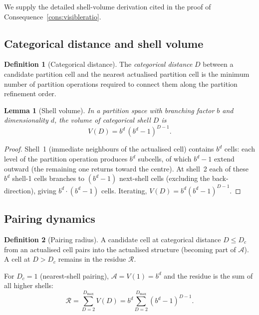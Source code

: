 \documentclass[11pt,twocolumn,a4paper]{article}
\theoremstyle{axiomstyle}
\theoremstyle{conseqstyle}
\newtheorem{lemma}{Lemma}
\theoremstyle{definition}
\newtheorem{definition}{Definition}
\theoremstyle{remark}
\newcommand{\Residue}{\mathcal{R}}
\begin{document}
We supply the detailed shell-volume derivation cited in the proof of Consequence~\ref{cons:visibleratio}.

\subsection{Categorical distance and shell volume}

\begin{definition}[Categorical distance]
The \emph{categorical distance} $D$ between a candidate partition cell and the nearest actualised partition cell is the minimum number of partition operations required to connect them along the partition refinement order.
\end{definition}

\begin{lemma}[Shell volume]\label{lem:shellvolume}
In a partition space with branching factor $b$ and dimensionality $d$, the volume of categorical shell $D$ is
\begin{equation}
V(D)=b^{d}\,(b^{d}-1)^{D-1}.
\end{equation}
\end{lemma}

\begin{proof}
Shell~1 (immediate neighbours of the actualised cell) contains $b^{d}$ cells: each level of the partition operation produces $b^{d}$ subcells, of which $b^{d}-1$ extend outward (the remaining one returns toward the centre). At shell~2 each of these $b^{d}$ shell-1 cells branches to $(b^{d}-1)$ next-shell cells (excluding the back-direction), giving $b^{d}\cdot(b^{d}-1)$ cells. Iterating, $V(D)=b^{d}(b^{d}-1)^{D-1}$.
\end{proof}

\subsection{Pairing dynamics}

\begin{definition}[Pairing radius]
A candidate cell at categorical distance $D\leq D_{c}$ from an actualised cell pairs into the actualised structure (becoming part of $\mathcal{A}$). A cell at $D>D_{c}$ remains in the residue $\Residue$.
\end{definition}

For $D_{c}=1$ (nearest-shell pairing), $\mathcal{A}=V(1)=b^{d}$ and the residue is the sum of all higher shells:
\begin{equation}
\Residue=\sum_{D=2}^{D_{\max}}V(D)=b^{d}\sum_{D=2}^{D_{\max}}(b^{d}-1)^{D-1}.
\end{equation}
\end{document}
